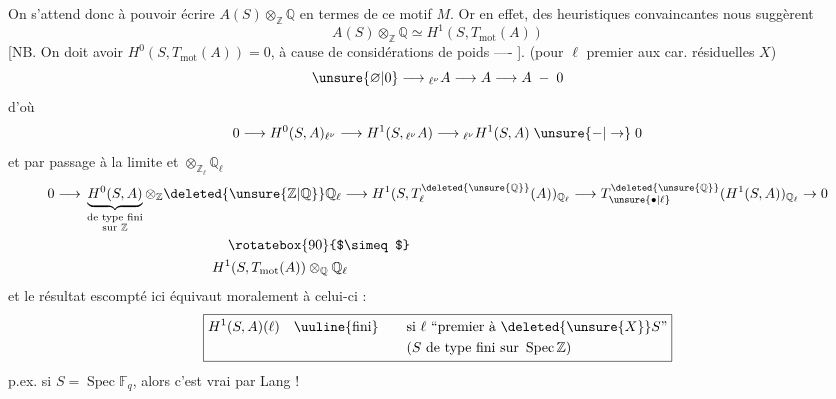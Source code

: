 On s'attend donc à pouvoir écrire %
$A(S)\otimes_{\mathbb{Z}}\mathbb{Q}$ en termes de ce motif $M$. %
Or en effet, des  heuristiques convaincantes %
 nous suggèrent %
\[
 A(S)\otimes_{\mathbb{Z}}\mathbb{Q}\simeq H^1(S,T_{\mathrm{mot}}(A)) %
\]
[NB. On doit avoir $H^0(S,T_{\mathrm{mot}}(A))=0$, %
à cause de  considérations de %
poids ---- ].   (pour $\ell$ premier %
aux car. résiduelles  $X$) %
\[
 \unsure{\varnothing|0}\longrightarrow{}_{\ell^\nu}A\longrightarrow A\longrightarrow A\;-\;0 %
\]
d'où %
\[
 0\longrightarrow H^0(S,A)_{\ell^\nu}\longrightarrow H^1(S,{}_{\ell^\nu}A)
 \longrightarrow{}_{\ell^\nu}H^1(S,A)\;\unsure{-|\to}\;0 %
\]
et par passage à la limite et $\otimes_{\mathbb{Z}_\ell}\mathbb{Q}_\ell$ %
\[
\begin{aligned}
0\longrightarrow {}&
\underbrace{H^0(S,A)}_{\substack{\text{de type fini}\\\text{sur }\mathbb{Z}}}
\otimes_{\mathbb{Z}}\deleted{\unsure{\mathbb{Z}|\mathbb{Q}}}\mathbb{Q}_\ell
 \longrightarrow H^1(S,T_{\ell}^{\deleted{\unsure{\mathbb{Q}}}}(A))_{\mathbb{Q}_\ell}
 \longrightarrow T_{\unsure{\bullet|\ell}}^{\deleted{\unsure{\mathbb{Q}}}}(H^1(S,A))_{\mathbb{Q}_\ell}\to0\\ %
&\hspace{36mm}\rotatebox{90}{$\simeq$}\\ %
&\hspace{32mm}H^1(S,T_{\mathrm{mot}}(A))\otimes_{\mathbb{Q}}\mathbb{Q}_{\ell}
\end{aligned} %
\]
et le résultat escompté ici équivaut %
moralement à celui-ci : %
\[
\boxed{\begin{aligned}
H^1(S,A)(\ell)\quad\text{\uuline{fini}}\qquad&\text{si }\ell\ \text{\textquotedblleft premier à } \deleted{\unsure{X}}S\text{\textquotedblright}\\ %
&\text{(}S\text{ de type fini sur }\operatorname{Spec}\mathbb{Z}\text{)}
\end{aligned}} %
\]
p.ex. si $S=\operatorname{Spec}\mathbb{F}_q$, alors c'est vrai par Lang ! %
